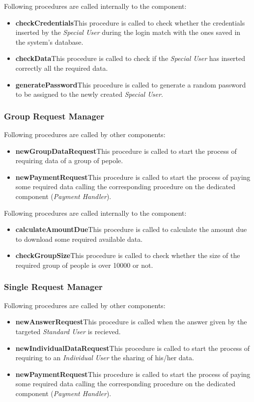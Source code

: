 \myparagraph{}
Following procedures are called internally to the component:
\begin{itemize}
  \item \textbf{checkCredentials}\quad This procedure is called to check whether the credentials inserted by the \textit{Special User} during the login match with the ones saved in the system's database.
  \item \textbf{checkData}\quad This procedure is called to check if the \textit{Special User} has inserted correctly all the required data.
  \item \textbf{generatePassword}\quad This procedure is called to generate a random password to be assigned to the newly created \textit{Special User}.
\end{itemize}

\subsubsection{Group Request Manager}
Following procedures are called by other components:
\begin{itemize}
  \item \textbf{newGroupDataRequest}\quad This procedure is called to start the process of requiring data of a group of pepole.
  \item \textbf{newPaymentRequest}\quad This procedure is called to start the process of paying some required data calling the corresponding procedure on the dedicated component (\textit{Payment Handler}).
\end{itemize}

\myparagraph{}
Following procedures are called internally to the component:
\begin{itemize}
  \item \textbf{calculateAmountDue}\quad This procedure is called to calculate the amount due to download some required available data.
  \item \textbf{checkGroupSize}\quad This procedure is called to check whether the size of the required group of people is over 10000 or not.
\end{itemize}

\subsubsection{Single Request Manager}
Following procedures are called by other components:
\begin{itemize}
  \item \textbf{newAnswerRequest}\quad This procedure is called when the answer given by the targeted \textit{Standard User} is recieved.
  \item \textbf{newIndividualDataRequest}\quad This procedure is called to start the process of requiring to an \textit{Individual User} the sharing of his/her data.
  \item \textbf{newPaymentRequest}\quad This procedure is called to start the process of paying some required data calling the corresponding procedure on the dedicated component (\textit{Payment Handler}).
\end{itemize}

